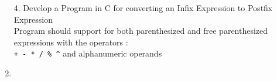 \documentclass{article}
\newcommand{\answer}{\item [$\rightarrow$]}
\begin{document}
	\begin{enumerate}
		\item [4.] Develop a Program in C for converting an Infix Expression to Postfix Expression \\
		Program should support for both parenthesized and free parenthesized expressions with the operators : \\
		\verb|+ - * / % ^| and alphanumeric operands
		\answer \inputminted{c}{../../Program4.c}
	\end{enumerate}
\end{document}
